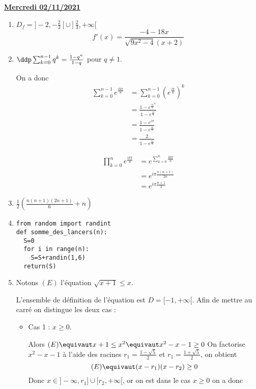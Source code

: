 \documentclass[a4paper, 11pt,reqno]{article}
\newcommand{\jour}[1]{
\begin{center}
\underline{\textbf{#1}}
\end{center}

 }
\begin{document}
\jour{Mercredi 02/11/2021}
\begin{correction}
\begin{enumerate}
\item $D_f =]-2,-\frac{2}{3}[ \cup ]\frac{2}{3},+\infty[$
$$f'(x) =\frac{-4-18x}{\sqrt{9x^2-4} (x+2)}$$
\item 
$\ddp \sum_{k=0}^{n-1} q^k = \frac{1-q^n}{1-q}$ pour $q\neq 1$. 

On a donc 
\begin{align*}
\sum_{k=0}^{n-1} e^{\frac{ik\pi}{n}}&=\sum_{k=0}^{n-1} \left(e^{\frac{i \pi}{n}} \right)^k\\
														&=  \frac{1-e^{\frac{i \pi}{n}^n}}{1-e^{\frac{i \pi}{n}}}\\
														&=\frac{1-e^{i \pi}}{1-e^{\frac{i \pi}{n}}}\\
														&=\frac{2}{1-e^{\frac{i \pi}{n}}}
\end{align*}


\begin{align*}
\prod_{k=0}^n e^{\frac{ik\pi}{n}} &=e^{\sum_{k=0}^n \frac{ik\pi}{n}}\\
													&= e^{i\pi\frac{n(n+1)}{2n}}\\
													&= e^{i\pi\frac{n+1}{2}}
\end{align*} 

\item $\frac{1}{2}\left( \frac{n(n+1)(2n+1)}{6} +n\right)$
\item \begin{lstlisting}
from random import randint
def somme_des_lancers(n):
  S=0
  for i in range(n):
    S=S+randin(1,6)
  return(S)
\end{lstlisting}
\item Notons $(E)$ l'équation $\sqrt{x+1} \leq x$.


L'ensemble de définition de l'équation est $D=[-1,+\infty[$.
Afin de mettre au carré on distingue les deux cas : 
\begin{itemize}
\item Cas 1 : $x\geq 0$.

Alors $(E) \equivaut x+1 \leq x^2 \equivaut x^2-x-1\geq 0$
On factorise $x^2-x-1$ à l'aide des racines $r_1=\frac{1-\sqrt{5}}{2}$ et $r_1=\frac{1+\sqrt{5}}{2}$, on obtient 
$$(E) \equivaut (x-r_1)(x-r_2)\geq 0$$
Donc $x\in ]-\infty ,r_1]\cup[r_2,+\infty[ $, or on est dans le cas $x\geq 0$ on  a donc 
\begin{center}
\fbox{cas 1 $x\in [\frac{1+\sqrt{5}}{2},+\infty[$}


\end{center}
\end{itemize}
\end{enumerate}
\end{correction}
\end{document}
